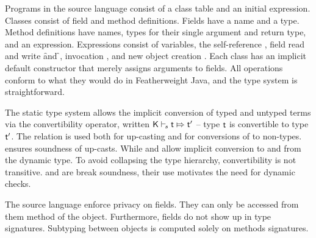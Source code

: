\documentclass[sigconf]{acmart}
\begin{document}
Programs in the source language consist of a class table and an initial
expression. Classes consist of field and method definitions. Fields have a
name and a type. Method definitions have names, types for their single
argument and return type, and an expression. Expressions consist of
variables, the self-reference \this, field read and write \FRead\f and
\FWrite\f\e, invocation \Call\e\m\e, and new object creation
\New{}. Each class has an implicit default constructor that merely
assigns arguments to fields. All operations conform to what they would do in
Featherweight Java, and the type system is straightforward.

The static type system allows the implicit conversion of typed and untyped
terms via the convertibility operator, written $\ConvertE\K s\t\tp$ -- type
$\t$ is convertible to type $\tp$.  The relation is used both for up-casting
and for conversions of \any to non-\any types.   ensures
soundness of up-casts. While  and  allow implicit
conversion to and from the dynamic type.  To avoid collapsing the type
hierarchy, convertibility is not transitive.  and
 are break soundness, their use motivates the need for dynamic
checks. 

The source language enforce privacy on fields. They can only be accessed
from them method of the object. Furthermore, fields do not show up in type
signatures. Subtyping between objects is computed solely on methods
signatures.
\end{document}
